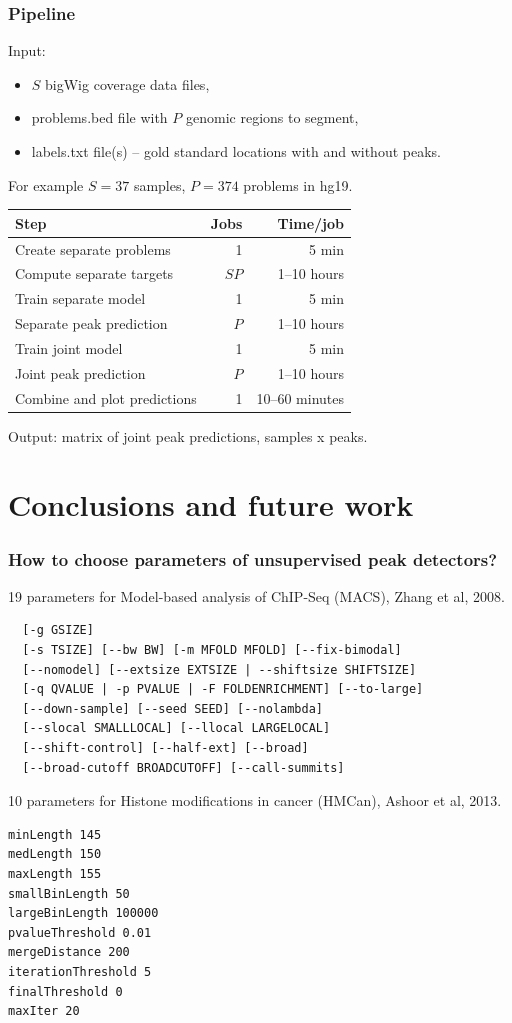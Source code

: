 \documentclass{beamer}
\begin{document}
\begin{frame}
  \frametitle{Pipeline}
Input:
\begin{itemize}
\item $S$ bigWig coverage data files, 
\item problems.bed file with $P$ genomic regions to segment, 
\item labels.txt file(s) -- gold standard locations with and without peaks.
\end{itemize}
For example $S=37$ samples, $P=374$ problems in hg19.
\vskip 0.2cm
  \begin{tabular}{lrr}
    Step& Jobs& Time/job \\
    \hline
    Create separate problems & 1 & 5 min\\
    Compute separate targets & $S P$ & 1--10 hours\\
    Train separate model & 1 & 5 min \\
    Separate peak prediction & $P$ & 1--10 hours\\
    Train joint model & 1 & 5 min \\
    Joint peak prediction & $P$ & 1--10 hours\\
    Combine and plot predictions & 1 & 10--60 minutes
  \end{tabular}
\vskip 0.2cm
Output: matrix of joint peak predictions, samples x peaks.
\end{frame}

\section{Conclusions and future work}

\begin{frame}[fragile]
  \frametitle{How to choose parameters of unsupervised peak
    detectors?}
\scriptsize
19 parameters for Model-based analysis of ChIP-Seq (MACS), Zhang et al, 2008.
\begin{verbatim}
  [-g GSIZE]
  [-s TSIZE] [--bw BW] [-m MFOLD MFOLD] [--fix-bimodal]
  [--nomodel] [--extsize EXTSIZE | --shiftsize SHIFTSIZE]
  [-q QVALUE | -p PVALUE | -F FOLDENRICHMENT] [--to-large]
  [--down-sample] [--seed SEED] [--nolambda]
  [--slocal SMALLLOCAL] [--llocal LARGELOCAL]
  [--shift-control] [--half-ext] [--broad]
  [--broad-cutoff BROADCUTOFF] [--call-summits]
\end{verbatim}
10 parameters for Histone modifications in cancer (HMCan),
Ashoor et al, 2013.
\begin{verbatim}
minLength 145
medLength 150
maxLength 155
smallBinLength 50
largeBinLength 100000
pvalueThreshold 0.01
mergeDistance 200
iterationThreshold 5
finalThreshold 0
maxIter 20
\end{verbatim}
\end{frame}
\end{document}
